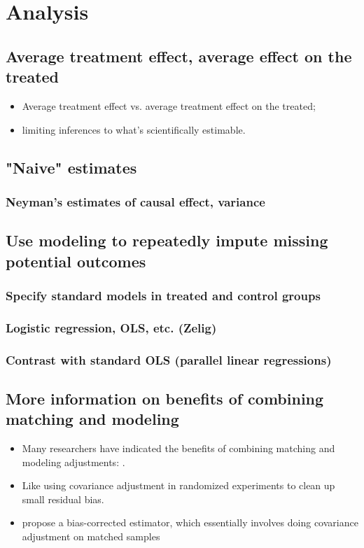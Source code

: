 \documentclass[11pt,titlepage]{article}
\begin{document}
\section{Analysis}
\label{analysis}
\subsection{Average treatment effect, average effect on the treated}
\begin{itemize} 
\item Average treatment effect vs. average
  treatment effect on the treated; 
\item limiting inferences to what's
  scientifically estimable. 
\end{itemize}

\subsection{"Naive" estimates}
\subsubsection{Neyman's estimates of causal effect, variance}
\subsection{Use modeling to repeatedly impute missing potential outcomes}
\subsubsection{Specify standard models in treated and control groups}
\subsubsection{Logistic regression, OLS, etc. (Zelig)}
\subsubsection{Contrast with standard OLS (parallel linear regressions)}
\subsection{More information on benefits of combining matching and modeling}
\begin{itemize}
\item Many researchers have indicated the benefits of combining matching and modeling adjustments: \cite{Rubin73b, RobRot95, HecHidTod97, AbaImb04}.                          
\item Like using covariance adjustment in randomized experiments to clean up small residual bias.
\item \cite{AbaImb04} propose a bias-corrected estimator, which essentially involves doing covariance adjustment on matched samples
\end{itemize} 
\end{document}
